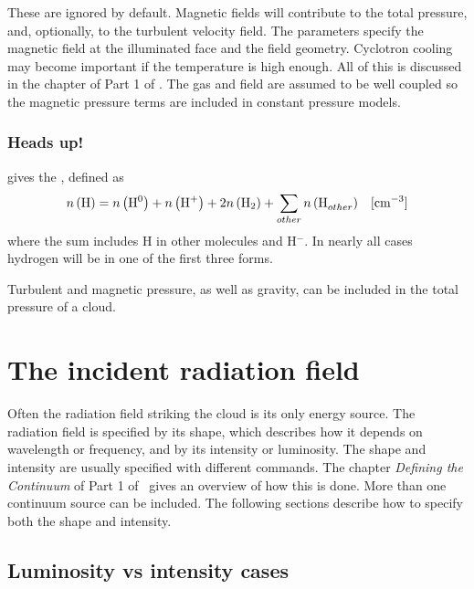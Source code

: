 \documentclass[12pt,twoside]{article}
\begin{document}
{\quad These are ignored
\label{command:MagneticField}
by default.  Magnetic fields will
contribute to the total pressure, and, optionally, to the turbulent velocity
field.  The parameters specify the magnetic field at the illuminated face
and the field geometry.
Cyclotron cooling may become important if the
temperature is high enough.
All of this is discussed in the chapter
 of Part 1 of \Hazy.
The gas and field are assumed to be well
coupled so the magnetic pressure terms are included in constant pressure
models.

\subsubsection{Heads up!}
 gives the , defined as
\begin{equation}
n\left( {\rm{H}} \right) = n\left( {{\rm{H}}^{\rm{0}} } \right) + n\left(
{{\rm{H}}^ +  } \right) + 2n\left( {{\rm{H}}_2 } \right) +
\sum\limits_{other} {n\left( {{\rm{H}}_{other}^{} } \right)}
\quad \rm{[cm^{-3}]}
\end{equation}
where the sum includes H in other molecules and H$^-$.  In nearly all cases
hydrogen will be in one of the first three forms.

Turbulent and magnetic pressure, as well as gravity, can be included in the total pressure
of a  cloud.

\section{The incident radiation field}
\label{sec:IncidentRadiationField}

Often the radiation field striking the cloud is its only energy source.
The radiation field is specified by its shape, which describes how it depends
on wavelength or frequency, and by its intensity or luminosity.  The shape
and intensity are usually specified with different commands.
The chapter
\emph{Defining the Continuum} of Part 1 of
\Hazy\ gives an overview of how this is
done.  More than one continuum source can be included.  The following
sections describe how to specify both the shape and intensity.

\subsection{Luminosity vs intensity cases}
\label{sec:LuminosityVsIntensityCases}

}
\end{document}
